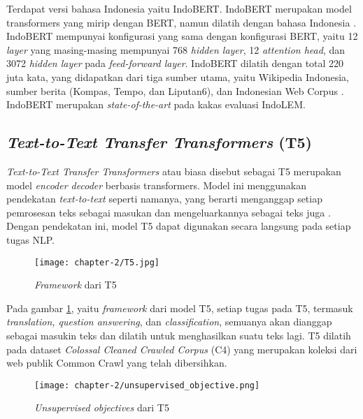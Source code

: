Terdapat versi bahasa Indonesia yaitu IndoBERT. IndoBERT merupakan model transformers yang mirip dengan BERT, namun dilatih dengan bahasa Indonesia \parencite{indolem}. IndoBERT mempunyai konfigurasi yang sama dengan konfigurasi BERT, yaitu 12 \textit{layer} yang masing-masing mempunyai 768 \textit{hidden layer}, 12 \textit{attention head}, dan 3072 \textit{hidden layer} pada \textit{feed-forward layer}. IndoBERT dilatih dengan total 220 juta kata, yang didapatkan dari tiga sumber utama, yaitu Wikipedia Indonesia, sumber berita (Kompas, Tempo, dan Liputan6), dan Indonesian Web Corpus \parencite{indolem}. IndoBERT merupakan \textit{state-of-the-art} pada kakas evaluasi IndoLEM.

\subsection{\textit{Text-to-Text Transfer Transformers} (T5)}

\textit{Text-to-Text Transfer Transformers} atau biasa disebut sebagai T5 merupakan model \textit{encoder decoder} berbasis transformers. Model ini menggunakan pendekatan \textit{text-to-text} seperti namanya, yang berarti menganggap setiap pemrosesan teks sebagai masukan dan mengeluarkannya sebagai teks juga \parencite{T5}. Dengan pendekatan ini, model T5 dapat digunakan secara langsung pada setiap tugas NLP.

\begin{figure}[ht]
    \vspace{0.25cm}
    \centering
    \texttt{[image: chapter-2/T5.jpg]}
    \caption{\textit{Framework} dari T5 \parencite{T5}}
    \label{fig:T5}
\end{figure}

Pada gambar \ref{fig:T5}, yaitu \textit{framework} dari model T5, setiap tugas pada T5, termasuk \textit{translation, question answering}, dan \textit{classification}, semuanya akan dianggap sebagai masukin teks dan dilatih untuk menghasilkan suatu teks lagi. T5 dilatih pada dataset \textit{Colossal Cleaned Crawled Corpus} (C4) yang merupakan koleksi dari web publik Common Crawl yang telah dibersihkan.

\begin{figure}[ht]
    \vspace{0.25cm}
    \centering
    \texttt{[image: chapter-2/unsupervised\_objective.png]}
    \caption{\textit{Unsupervised objectives} dari T5 \parencite{T5}}
    \label{fig:unsupervised-T5}
\end{figure}

